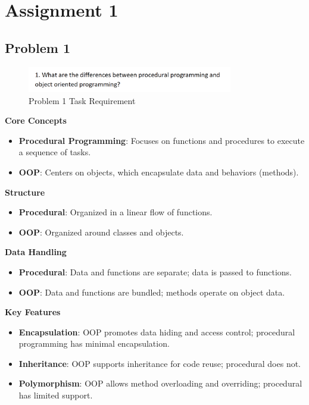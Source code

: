 \documentclass{article}
\begin{document}
\section*{Assignment 1}

\subsection*{Problem 1}

\begin{figure}[H]
    \centering
    \includegraphics[width=0.8\textwidth]{./Assets/Task requirements/Assignment1/1.png}
    \caption{Problem 1 Task Requirement}
\end{figure}

\textbf{Core Concepts}
\begin{itemize}
    \item \textbf{Procedural Programming}: Focuses on functions and procedures to execute a sequence of tasks.
    \item \textbf{OOP}: Centers on objects, which encapsulate data and behaviors (methods).
\end{itemize}

\textbf{Structure}
\begin{itemize}
    \item \textbf{Procedural}: Organized in a linear flow of functions.
    \item \textbf{OOP}: Organized around classes and objects.
\end{itemize}

\textbf{Data Handling}
\begin{itemize}
    \item \textbf{Procedural}: Data and functions are separate; data is passed to functions.
    \item \textbf{OOP}: Data and functions are bundled; methods operate on object data.
\end{itemize}

\textbf{Key Features}
\begin{itemize}
    \item \textbf{Encapsulation}: OOP promotes data hiding and access control; procedural programming has minimal encapsulation.
    \item \textbf{Inheritance}: OOP supports inheritance for code reuse; procedural does not.
    \item \textbf{Polymorphism}: OOP allows method overloading and overriding; procedural has limited support.
\end{itemize}
\end{document}

